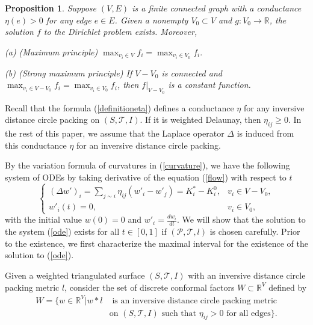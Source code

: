 \documentclass[12pt]{amsart}
\newtheorem{proposition}[theorem]{Proposition}
\begin{document}
\begin{proposition}\label{mpgraph} Suppose $(V,E)$ is a finite
	connected graph with a conductance $\eta(e)>0$ for any edge $e\in E$. Given a nonempty $V_0 \subset V$ and $g:V_0\to \mathbb{R}$, the solution $f$ to the Dirichlet problem exists. Moreover,
	
	(a) (Maximum principle)
	$ \max_{v_i \in V}
	f_i =\max_{ v_i \in V_0} f_i.$
	
	(b) (Strong maximum principle) If $V-V_0$ is connected and
	$\max_{v_i\in V-V_0} f_i =\max_{v_i \in V_0} f_i$,
	then $f|_{V-V_0}$ is a constant function.
\end{proposition}

Recall that the formula (\ref{definitioneta}) defines a conductance $\eta$ for any inversive distance circle packing on $(S, \mathcal{T}, I)$. If it is weighted Delaunay, then $\eta_{ij}\geq 0$. In the rest of this paper, we assume that the Laplace operator $\Delta$ is induced from this conductance $\eta$ for an inversive distance circle packing.

By the variation formula of curvatures in (\ref{curvature}), we have the following system of ODEs by taking derivative of the equation (\ref{flow}) with respect to $t$
    \begin{equation}
    \label{ode} \left\{ {\begin{array}{lr}
			{{(\Delta w')}_i} = \sum\limits_{j \sim i} {\eta _{ij}}({w'_i} - {w'_j}) = K_i^* - K_i^0,& v_i \in V - {V_0},\\
			{w'_i}(t) = 0, & v_i \in {V_0},
	\end{array}} \right. \end{equation}
with the initial value $w(0) = 0$ and $w'_i = \frac{dw_i}{dt}$. We will show that the solution to the system (\ref{ode}) exists for all $t \in [0,1]$ if $(\mathcal{P},\mathcal{T}, l)$ is chosen carefully. Prior to the existence, we first characterize the maximal interval for the existence of the solution to (\ref{ode}).

Given a weighted triangulated surface $(S, \mathcal{T}, I)$ with an inversive distance circle packing metric $l$, consider the set of discrete conformal factors $W\subset \mathbb{R}^V$ defined by
\begin{equation}\label{space W}
\begin{aligned}
  W = \{w\in \mathbb{R}^V | w*l &\text{ is an inversive distance circle packing metric}\\
   &\text{on $(S, \mathcal{T}, I)$ such that $\eta_{ij}>0$ for all edges}\}.
   \end{aligned}
\end{equation}
\end{document}
